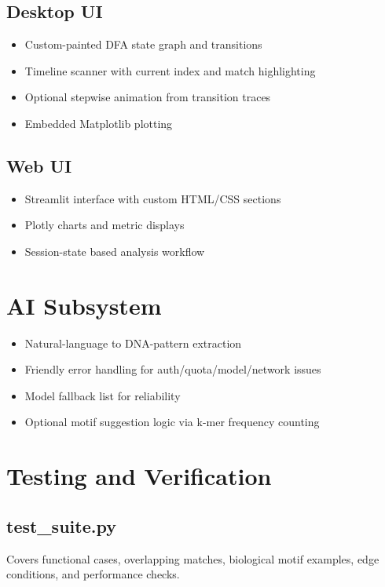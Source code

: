 \documentclass[11pt]{article}
\begin{document}
\subsection{Desktop UI}
\begin{itemize}[leftmargin=*]
  \item Custom-painted DFA state graph and transitions
  \item Timeline scanner with current index and match highlighting
  \item Optional stepwise animation from transition traces
  \item Embedded Matplotlib plotting
\end{itemize}

\subsection{Web UI}
\begin{itemize}[leftmargin=*]
  \item Streamlit interface with custom HTML/CSS sections
  \item Plotly charts and metric displays
  \item Session-state based analysis workflow
\end{itemize}

\section{AI Subsystem}
\begin{itemize}[leftmargin=*]
  \item Natural-language to DNA-pattern extraction
  \item Friendly error handling for auth/quota/model/network issues
  \item Model fallback list for reliability
  \item Optional motif suggestion logic via k-mer frequency counting
\end{itemize}

\section{Testing and Verification}
\subsection{test\_suite.py}
Covers functional cases, overlapping matches, biological motif examples, edge conditions, and performance checks.
\end{document}
